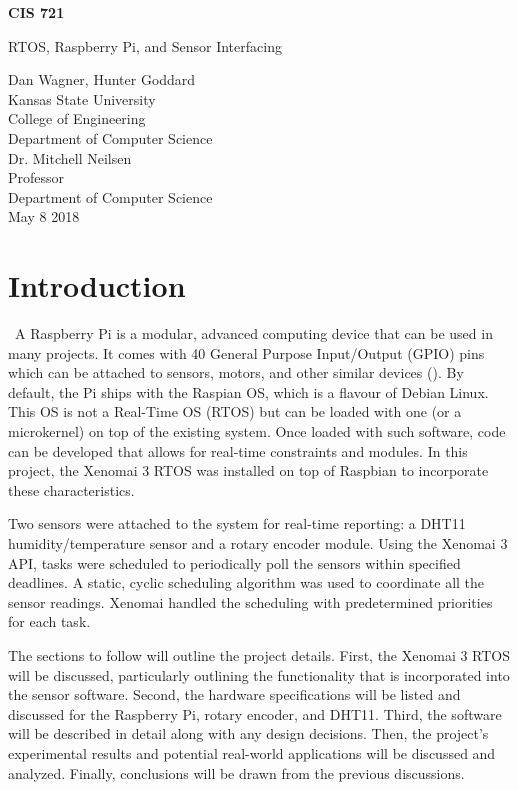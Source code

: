 \documentclass[letterpaper, 12pt]{article}
\begin{document}
	\begin{titlepage}
		\centering
		\vspace*{5.75cm}
		{\huge\bfseries CIS 721\par}
		{\large RTOS, Raspberry Pi, and Sensor Interfacing\par}
		\vspace{2cm}
		Dan Wagner, Hunter Goddard\\
		Kansas State University\\
		College of Engineering\\
		Department of Computer Science\\
		\vspace{1cm}
		Dr. Mitchell Neilsen\\
		Professor\\
		Department of Computer Science\\
		\vspace{1cm}
		May 8 2018
	\end{titlepage}

\section{Introduction}

~\indent A Raspberry Pi is a modular, advanced computing device that can be used in many projects.  It comes with 40 General Purpose Input/Output (GPIO) pins which can be attached to sensors, motors, and other similar devices (\cite{raspberrypifoundation2018}).  By default, the Pi ships with the Raspian OS, which is a flavour of Debian Linux.  This OS is not a Real-Time OS (RTOS) but can be loaded with one (or a microkernel) on top of the existing system.  Once loaded with such software, code can be developed that allows for real-time constraints and modules.  In this project, the Xenomai 3 RTOS was installed on top of Raspbian to incorporate these characteristics.

\indent Two sensors were attached to the system for real-time reporting: a DHT11 humidity/temperature sensor and a rotary encoder module.  Using the Xenomai 3 API, tasks were scheduled to periodically poll the sensors within specified deadlines.  A static, cyclic scheduling algorithm was used to coordinate all the sensor readings.  Xenomai handled the scheduling with predetermined priorities for each task.

\indent The sections to follow will outline the project details.  First, the Xenomai 3 RTOS will be discussed, particularly outlining the functionality that is incorporated into the sensor software.  Second, the hardware specifications will be listed and discussed for the Raspberry Pi, rotary encoder, and DHT11.  Third, the software will be described in detail along with any design decisions.  Then, the project's experimental results and potential real-world applications will be discussed and analyzed.  Finally, conclusions will be drawn from the previous discussions.
\end{document}
